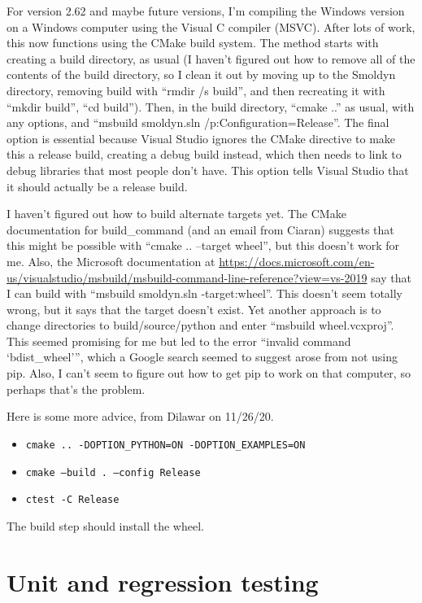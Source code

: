\documentclass {scrbook}
\newcommand {\ttt} {\texttt}
\begin{document}
For version 2.62 and maybe future versions, I'm compiling the Windows version on a Windows computer using the Visual C compiler (MSVC). After lots of work, this now functions using the CMake build system. The method starts with creating a build directory, as usual (I haven't figured out how to remove all of the contents of the build directory, so I clean it out by moving up to the Smoldyn directory, removing build with ``rmdir /s build'', and then recreating it with ``mkdir build'', ``cd build''). Then, in the build directory, ``cmake ..'' as usual, with any options, and ``msbuild smoldyn.sln /p:Configuration=Release''. The final option is essential because Visual Studio ignores the CMake directive to make this a release build, creating a debug build instead, which then needs to link to debug libraries that most people don't have. This option tells Visual Studio that it should actually be a release build.

I haven't figured out how to build alternate targets yet. The CMake documentation for build\_command (and an email from Ciaran) suggests that this might be possible with ``cmake .. --target wheel'', but this doesn't work for me. Also, the Microsoft documentation at \url{https://docs.microsoft.com/en-us/visualstudio/msbuild/msbuild-command-line-reference?view=vs-2019} say that I can build with ``msbuild smoldyn.sln -target:wheel''. This doesn't seem totally wrong, but it says that the target doesn't exist. Yet another approach is to change directories to build/source/python and enter ``msbuild wheel.vcxproj''. This seemed promising for me but led to the error ``invalid command `bdist\_wheel''', which a Google search seemed to suggest arose from not using pip. Also, I can't seem to figure out how to get pip to work on that computer, so perhaps that's the problem.

Here is some more advice, from Dilawar on 11/26/20.
\begin{itemize}
\item \ttt{cmake .. -DOPTION\_PYTHON=ON -DOPTION\_EXAMPLES=ON}
\item \ttt{cmake --build . --config Release}
\item \ttt{ctest -C Release}
\end{itemize}
The build step should install the wheel.

\section{Unit and regression testing}
\end{document}
